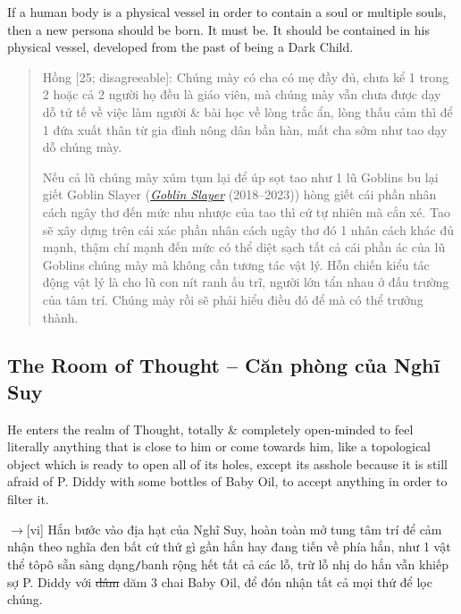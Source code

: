 \documentclass[12pt,oneside]{book}
\begin{document}
If a human body is a physical vessel in order to contain a soul or multiple souls, then a new persona should be born. It must be. It should be contained in his physical vessel, developed from the past of being a Dark Child.
\begin{quote}
	{\sf Hồng [25; disagreeable]}: Chúng mày có cha có mẹ đầy đủ, chưa kể 1 trong 2 hoặc cả 2 người họ đều là giáo viên, mà chúng mày vẫn chưa được dạy dỗ tử tế về việc làm người \& bài học về lòng trắc ẩn, lòng thấu cảm thì để 1 đứa xuất thân từ gia đình nông dân bần hàn, mất cha sớm như tao dạy dỗ chúng mày.
	
	Nếu cả lũ chúng mày xúm tụm lại để úp sọt tao như 1 lũ Goblins bu lại giết Goblin Slayer (\href{https://www.imdb.com/title/tt8690728/}{\it Goblin Slayer} (2018--2023)) hòng giết cái phần nhân cách ngây thơ đến mức nhu nhược của tao thì cứ tự nhiên mà cắn xé. Tao sẽ xây dựng trên cái xác phần nhân cách ngây thơ đó 1 nhân cách khác đủ mạnh, thậm chí mạnh đến mức có thể diệt sạch tất cả cái phần ác của lũ Goblins chúng mày mà không cần tương tác vật lý. Hỗn chiến kiểu tác động vật lý là cho lũ con nít ranh ấu trĩ, người lớn tẩn nhau ở đấu trường của tâm trí. Chúng mày rồi sẽ phải hiểu điều đó để mà có thể trưởng thành.
\end{quote}

\subsection{The Room of Thought -- Căn phòng của Nghĩ Suy}
He enters the realm of Thought, totally \& completely open-minded to feel literally anything that is close to him or come towards him, like a topological object which is ready to open all of its holes, except its asshole because it is still afraid of {\sc P. Diddy} with some bottles of Baby Oil, to accept anything in order to filter it.

{\sf[en]$\to$[vi]} Hắn bước vào địa hạt của Nghĩ Suy, hoàn toàn mở tung tâm trí để cảm nhận theo nghĩa đen bất cứ thứ gì gần hắn hay đang tiến về phía hắn, như 1 vật thể tôpô sẵn sàng dạng{\tt/}banh rộng hết tất cả các lỗ, trừ lỗ nhị do hắn vẫn khiếp sợ {\sc P. Diddy} với \st{dâm} dăm 3 chai Baby Oil, để đón nhận tất cả mọi thứ để lọc chúng.
\end{document}
